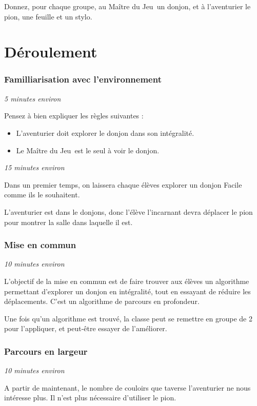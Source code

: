 \documentclass{article}
\newcommand{\mj}{Maître du Jeu}
\begin{document}
    \bigskip
    Donnez, pour chaque groupe, au \mj\ un donjon, et à l'aventurier le pion, une feuille et un stylo.

\newpage

\part{Déroulement}
    \section{Familliarisation avec l'environnement}

        \emph{5 minutes environ}

        Pensez à bien expliquer les règles suivantes :
        \begin{itemize}
            \item L'aventurier doit explorer le donjon dans son intégralité.
            \item Le \mj\ est le seul à voir le donjon.
        \end{itemize}
        \bigskip

        \emph{15 minutes environ}

        Dans un premier temps, on laissera chaque élèves explorer un donjon Facile comme ils le souhaitent.

        L'aventurier est dans le donjons, donc l'élève l'incarnant devra déplacer le pion pour montrer la salle dans laquelle il est.

    \section{Mise en commun}
        \emph{10 minutes environ}

        L'objectif de la mise en commun est de faire trouver aux élèves un algorithme permettant d'explorer un donjon en intégralité, tout en essayant de réduire les déplacements. C'est un algorithme de parcours en profondeur.

        Une fois qu'un algorithme est trouvé, la classe peut se remettre en groupe de 2 pour l'appliquer, et peut-être essayer de l'améliorer.

    \section{Parcours en largeur}
        \emph{10 minutes environ}

        A partir de maintenant, le nombre de couloirs que taverse l'aventurier ne nous intéresse plus. Il n'est plus nécessaire d'utiliser le pion.
\end{document}
